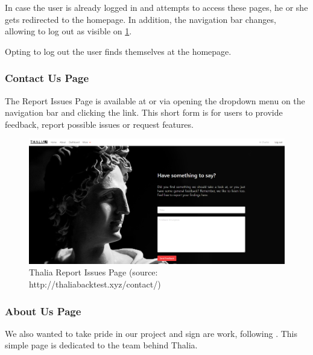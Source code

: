 \documentclass[main.tex]{subfiles}
\begin{document}
In case the user is already logged in and attempts to access these pages, he or she gets redirected to the homepage. In addition, the navigation bar changes, allowing to log out as visible on \figurename{\ref{thalia_issues}}.

Opting to log out the user finds themselves at the homepage.



\subsubsection{Contact Us Page}



The Report Issues Page is available at  or via opening the dropdown menu on the navigation bar and clicking the link. This short form is for users to provide feedback, report possible issues or request features.



\begin{figure}[H]

   \centering

   \includegraphics[width=\textwidth]{08Appendices/081User/081Pictures/issues.png}

   \caption{Thalia Report Issues Page (source: http://thaliabacktest.xyz/contact/)}

   \label{thalia_issues}

\end{figure}



\subsubsection{About Us Page}

We also wanted to take pride in our project and sign are work, following \cite{pragmaticprog_sign}. This simple page is dedicated to the team behind Thalia.
\end{document}
